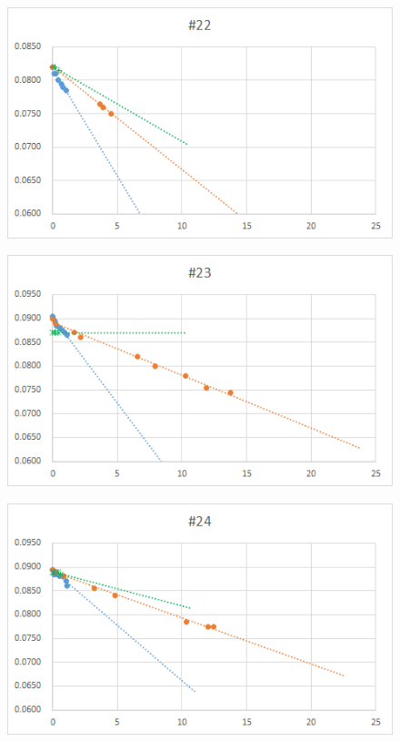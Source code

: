\documentclass[12pt,a4paper]{jarticle}
\begin{document}
\begin{figure}[htbp]
  \centering
     \includegraphics[width=120mm]{vol_022.png}
\end{figure}
\begin{figure}[htbp]
  \centering
     \includegraphics[width=120mm]{vol_023.png}
\end{figure}
\begin{figure}[htbp]
  \centering
     \includegraphics[width=120mm]{vol_024.png}
\end{figure}
\end{document}
